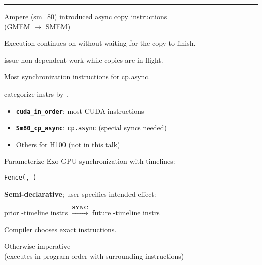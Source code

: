 \vfill
\hrule
\vfill

\begin{center}
\Large
\begin{tikzpicture}[node distance=0mm]

\end{tikzpicture}
\end{center}


\newpage
{}

{\LARGE
Ampere (sm\_80) introduced async copy instructions\\
(GMEM $\to$ SMEM)

Execution continues on without waiting for the copy to finish.


}

{\Large

}

{\LARGE
{} issue non-dependent  work while copies are in-flight.
}

\newpage
{}

{\LARGE
Most synchronization instructions  for cp.async.

 categorize instrs by .

\begin{itemize}
  \item \textbf{\texttt{cuda\_in\_order}}: most CUDA instructions
  \item \textbf{\texttt{Sm80\_cp\_async}}: \texttt{cp.async} (special syncs needed)
  \item Others for H100 (not in this talk)
\end{itemize}

}

\newpage
{}

{\LARGE
Parameterize Exo-GPU synchronization with timelines:

\begin{center}
  \texttt{Fence(, )}
\end{center}

\textbf{Semi-declarative}; user specifies intended effect:

\begin{center}
prior -timeline instrs $\xrightarrow{\textbf{SYNC}}$ future -timeline instrs
\end{center}

Compiler chooses exact instructions.

Otherwise imperative\\(executes in program order with surrounding instructions)

}

